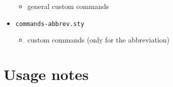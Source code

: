 \begin{itemize}
  \begin{itemize}
  
  \item
    general custom commands
  \end{itemize}
\item
  \texttt{commands-abbrev.sty}

  \begin{itemize}
  
  \item
    custom commands (only for the abbreviation)
  \end{itemize}
\end{itemize}

\section{Usage notes}
\label{sec:usage}
